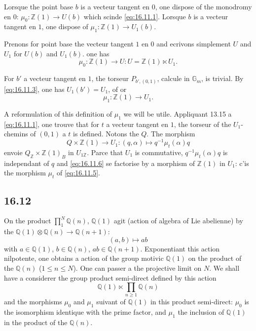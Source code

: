 \documentclass[12pt,a4paper]{article}
\theoremstyle{plain}
\theoremstyle{definition}
\theoremstyle{remark}
\newcommand{\Betti}{B}
\newcommand{\Gm}{\mathbb{G}_m}
\newcommand{\ZZ}{\mathbb{Z}}
\newcommand{\QQ}{\mathbb{Q}}
\begin{document}
Lorsque the point base $b$ is a vecteur tangent en $0$, one dispose of the
monodromy en $0$: $\mu_0 : \ZZ(1) \to U(b)$ which scinde
\eqref{eq:16.11.1}. Lorsque $b$ is a vecteur tangent en $1$, one dispose of
$\mu_1 : \ZZ(1) \to U_1(b)$.

Prenons for point base the vecteur tangent $1$ en $0$ and ecrivons
simplement $U$ and $U_1$ for $U(b)$ and $U_1(b)$. one has
\begin{equation}\label{eq:16.11.4}
\mu_0 : \ZZ(1) \to U : U = \ZZ(1) \ltimes U_1.
\end{equation}

For $b'$ a vecteur tangent en $1$, the torseur $P_{b',(0,1)}$, calcule
in $\Gm$, is trivial. By \eqref{eq:16.11.3}, one has $U_1(b') = U_1$,
of or
\begin{equation}\label{eq:16.11.5}
\mu_1 : \ZZ(1) \to U_1.
\end{equation}

A reformulation of this definition of $\mu_1$ we will be utile.
Appliquant 13.15 a \eqref{eq:16.11.1}, one trouve that for $t$ a vecteur
tangent en $1$, the torseur of the $U_1$-chemins of $(0,1)$ a $t$ is defined.
Notons the $Q$. The morphism
\begin{equation}\label{eq:16.11.6}
Q \times \ZZ(1) \to U_1 : (q,\alpha) \mapsto q^{-1}\mu_t(\alpha)q
\end{equation}
envoie $Q_\ZZ \times \ZZ(1)_\Betti$ in $U_{1\ZZ}$. Parce that $U_1$ is
commutative, $q^{-1}\mu_t(\alpha)q$ is independant of $q$ and
\eqref{eq:16.11.6} se factorise by a morphism of $\ZZ(1)$ in $U_1$:
c'is the morphism $\mu_t$ of \eqref{eq:16.11.5}.

\subsection*{16.12}

On the product $\prod_1^N \QQ(n)$, $\QQ(1)$ agit (action of algebra of Lie
abelienne) by the $\QQ(1) \otimes \QQ(n) \to \QQ(n+1)$:
\[
(a,b) \longmapsto ab
\]
with $a \in \QQ(1)$, $b \in \QQ(n)$, $ab \in \QQ(n+1)$. Exponentiant this
action nilpotente, one obtains a action of the group motivic $\QQ(1)$ on
the product of the $\QQ(n)$ ($1 \leq n \leq N$). One can passer a the projective limit on $N$. We shall have a considerer the group product
semi-direct defined by this action
\begin{equation}\label{eq:16.12.1}
\QQ(1) \ltimes \prod_{n \geq 1} \QQ(n)
\end{equation}
and the morphisms $\mu_0$ and $\mu_1$ suivant of $\QQ(1)$ in this product
semi-direct: $\mu_0$ is the isomorphism identique with the prime factor,
and $\mu_1$ the inclusion of $\QQ(1)$ in the product of the $\QQ(n)$.
\end{document}
